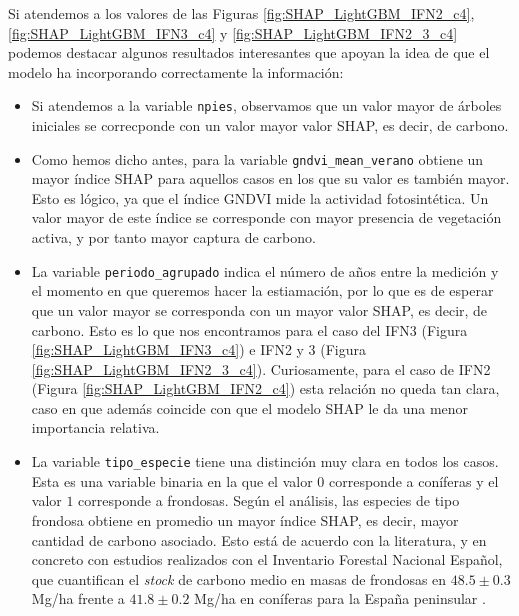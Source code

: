 Si atendemos a los valores de las Figuras \ref{fig:SHAP_LightGBM_IFN2_c4}, \ref{fig:SHAP_LightGBM_IFN3_c4} y \ref{fig:SHAP_LightGBM_IFN2_3_c4} podemos destacar algunos resultados interesantes que apoyan la idea de que el modelo ha incorporando correctamente la información:
\begin{itemize}
      \item Si atendemos a la variable \texttt{npies}, observamos que un valor mayor de árboles iniciales se correcponde con un valor mayor valor SHAP, es decir, de carbono.
      \item Como hemos dicho antes, para la variable \texttt{gndvi\_mean\_verano} obtiene un mayor índice SHAP para aquellos casos en los que su valor es también mayor. Esto es lógico, ya que el índice GNDVI mide la actividad fotosintética. Un valor mayor de este índice se corresponde con mayor presencia de vegetación activa, y por tanto mayor captura de carbono.
      \item La variable \texttt{periodo\_agrupado} indica el número de años entre la medición y el momento en que queremos hacer la estiamación, por lo que es de esperar que un valor mayor se corresponda con un mayor valor SHAP, es decir, de carbono. Esto es lo que nos encontramos para el caso del IFN3 (Figura \ref{fig:SHAP_LightGBM_IFN3_c4}) e IFN2 y 3 (Figura \ref{fig:SHAP_LightGBM_IFN2_3_c4}). Curiosamente, para el caso de IFN2 (Figura \ref{fig:SHAP_LightGBM_IFN2_c4}) esta relación no queda tan clara, caso en que además coincide con que el modelo SHAP le da una menor importancia relativa.
      \item La variable \texttt{tipo\_especie} tiene una distinción muy clara en todos los casos. Esta es una variable binaria en la que el valor $0$ corresponde a coníferas y el valor $1$ corresponde a frondosas. Según el análisis, las especies de tipo frondosa obtiene en promedio un mayor índice SHAP, es decir, mayor cantidad de carbono asociado. Esto está de acuerdo con la literatura, y en concreto con estudios realizados con el Inventario Forestal Nacional Español, que cuantifican el \textit{stock} de carbono medio en masas de frondosas en $48.5 \pm 0.3$ Mg/ha frente a $41.8 \pm 0.2$ Mg/ha en coníferas para la España peninsular \cite{vayreda2012carbon}. 
      

\end{itemize}
